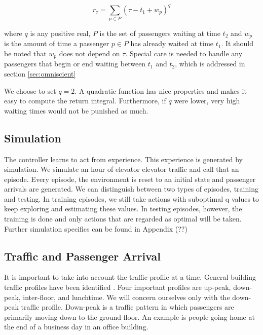 \begin{equation}
    r_\tau = \sum_{p\in P} (\tau - t_1 + w_p)^q
\end{equation}

where $q$ is any positive real, $P$ is the set of passengers waiting at time $t_2$ and $w_p$ is the amount of time a passenger $p\in P$ has already waited at time $t_1$. It should be noted that $w_p$ does not depend on $\tau$. Special care is needed to handle any passengers that begin or end waiting between $t_1$ and $t_2$, which is addressed in section \ref{sec:omniscient}

We choose to set $q=2$. A quadratic function has nice properties and makes it easy to compute the return integral. Furthermore, if $q$ were lower, very high waiting times would not be punished as much.

\subsection{Simulation}

The controller learns to act from experience. This experience is generated by simulation. We simulate an hour of elevator elevator traffic and call that an episode. Every episode, the environment is reset to an initial state and passenger arrivals are generated. We can distinguish between two types of episodes, training and testing. In training episodes, we still take actions with suboptimal q values to keep exploring and estimating these values. In testing episodes, however, the training is done and only actions that are regarded as optimal will be taken. Further simulation specifics can be found in Appendix {\color{red}(??)}

\subsection{Traffic and Passenger Arrival}

It is important to take into account the traffic profile at a time. General building traffic profiles have been identified \cite{elevator_dynamics}. Four important profiles are up-peak, down-peak, inter-floor, and lunchtime. We will concern ourselves only with the down-peak traffic profile. Down-peak is a traffic pattern in which passengers are primarily moving down to the ground floor. An example is people going home at the end of a business day in an office building.

